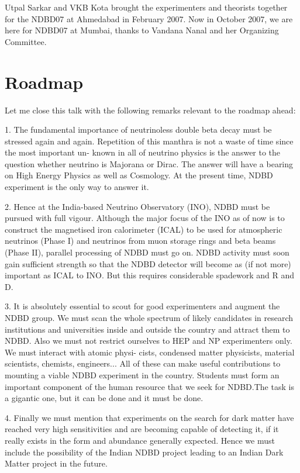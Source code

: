 Utpal Sarkar and VKB Kota brought the experimenters and theorists together for the
NDBD07 at Ahmedabad in February 2007. Now in October 2007, we are here for NDBD07
at Mumbai, thanks to Vandana Nanal and her Organizing Committee.

\section*{Roadmap}

Let me close this talk with the following remarks relevant to the roadmap ahead:

1. The fundamental importance of neutrinoless double beta decay must be stressed again
and again. Repetition of this manthra is not a waste of time since the most important un-
known in all of neutrino physics is the answer to the question whether neutrino is Majorana
or Dirac. The answer will have a bearing on High Energy Physics as well as Cosmology. At
the present time, NDBD experiment is the only way to answer it.

2. Hence at the India-based Neutrino Observatory (INO), NDBD must be pursued with
full vigour. Although the major focus of the INO as of now is to construct the magnetised
iron calorimeter (ICAL) to be used for atmospheric neutrinos (Phase I) and neutrinos from
muon storage rings and beta beams (Phase II), parallel processing of NDBD must go on.
NDBD activity must soon gain sufficient strength so that the NDBD detector will become
as (if not more) important as ICAL to INO. But this requires considerable spadework and
R and D.


3. It is absolutely essential to scout for good experimenters and augment the NDBD
group. We must scan the whole spectrum of likely candidates in research institutions and
universities inside and outside the country and attract them to NDBD. Also we must not
restrict ourselves to HEP and NP experimenters only. We must interact with atomic physi-
cists, condensed matter physicists, material scientists, chemists, engineers... All of these can
make useful contributions to mounting a viable NDBD experiment in the country. Students
must form an important component of the human resource that we seek for NDBD.The task
is a gigantic one, but it can be done and it must be done.

4. Finally we must mention that experiments on the search for dark matter have reached
very high sensitivities and are becoming capable of detecting it, if it really exists in the form
and abundance generally expected. Hence we must include the possibility of the Indian
NDBD project leading to an Indian Dark Matter project in the future.


